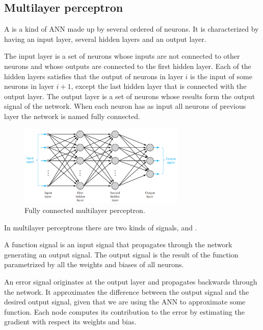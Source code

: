 \subsection{Multilayer perceptron}
A  is a kind of ANN made up by several ordered  of neurons.
It is characterized by having an input layer, several hidden layers and an output layer.

The input layer is a set of neurons whose inputs are not connected to other neurons and whose outputs are connected to
the first hidden layer.
Each of the hidden layers satisfies that the output of neurons in layer $i$ is the input of some neurons in layer $i+1$,
except the last hidden layer that is connected with the output layer.
The output layer is a set of neurons whose results form the output signal of the network.
When each neuron has as input all neurons of previous layer the network is named fully connected.

\begin{figure}[hbtp]
\begin{center}
\includegraphics[width=300]{img/multilayer_perceptron.png}
\end{center}
\caption[Multilayer perceptron diagram]
{Fully connected multilayer perceptron.}
\label{fig:FullyMP}
\end{figure}

In multilayer perceptrons there are two kinds of signals,  and .

A function signal is an input signal that propagates through the network generating an output signal.
The output signal is the result of the function parametrized by all the weights and biases of all neurons.

An error signal originates at the output layer and propagates backwards through the network.
It approximates the difference between the output signal and the desired output signal, given that we are using the \ac{ANN}
to approximate some function.
Each node computes its contribution to the error by estimating the gradient with respect its weights and bias.

